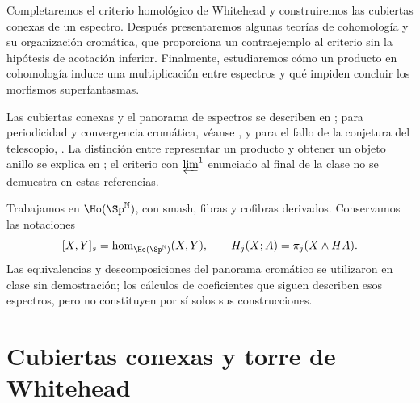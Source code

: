 
Completaremos el criterio homológico de Whitehead y construiremos las cubiertas conexas de un espectro. Después presentaremos algunas teorías de cohomología y su organización cromática, que proporciona un contraejemplo al criterio sin la hipótesis de acotación inferior. Finalmente, estudiaremos cómo un producto en cohomología induce una multiplicación entre espectros y qué impiden concluir los morfismos superfantasmas.

Las cubiertas conexas y el panorama de espectros se describen en \cite[definición~2.6.4.8, ejemplos~2.5.3.9--13 y 3.3.3.6]{malkiewich}; para periodicidad y convergencia cromática, véanse \cite[lección~27, teorema~4; lecciones~32--33, teorema~1 y su demostración]{lurie2010chromatic}, y para el fallo de la conjetura del telescopio, \cite[teorema~A y \S6.4]{bhls2023}. La distinción entre representar un producto y obtener un objeto anillo se explica en \cite[teorema~5.2 y \S6]{baker2002}; el criterio con $\varprojlim^{1}$ enunciado al final de la clase no se demuestra en estas referencias.

Trabajamos en $\Ho(\Sp^{\mathbb N})$, con smash, fibras y cofibras derivados. Conservamos las notaciones
\[
[X,Y]_s=\hom_{\Ho(\Sp^{\mathbb N})}(X,Y),
\qquad H_j(X;A)=\pi_j(X\wedge HA).
\]
Las equivalencias y descomposiciones del panorama cromático se utilizaron en clase sin demostración; los cálculos de coeficientes que siguen describen esos espectros, pero no constituyen por sí solos sus construcciones.

\section{Cubiertas conexas y torre de Whitehead}

